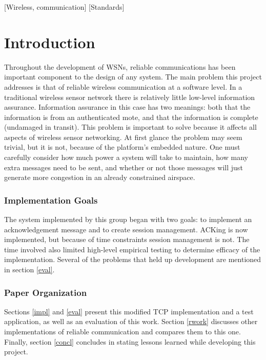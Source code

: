 \documentclass{sig-alternate}
\begin{document}
[Wireless, communication]
[Standards]


\section{Introduction}\label{intro}
Throughout the development of WSNs, reliable communications has been important component to the design of any system. The main problem this project addresses is that of reliable wireless communication at a software level. In a traditional wireless sensor network there is relatively little low-level information assurance. \cite{changsoo:routing} Information assurance in this case has two meanings: both that the information is from an authenticated mote, and that the information is complete (undamaged in transit). This problem is important to solve because it affects all aspects of wireless sensor networking. At first glance the problem may seem trivial, but it is not, because of the platform's embedded nature. One must carefully consider how much power a system will take to maintain, how many extra messages need to be sent, and whether or not those messages will just generate more congestion in an already constrained airspace.

\subsubsection*{Implementation Goals}
The system implemented by this group began with two goals: to implement an acknowledgement message and to create session management. ACKing is now implemented, but because of time constraints session management is not. The time involved also limited high-level empirical testing to determine efficacy of the implementation. Several of the problems that held up development are mentioned in section \ref{eval}.

\subsubsection*{Paper Organization}
Sections \ref{impl} and \ref{eval} present this modified TCP implementation and a test application, as well as an evaluation of this work. Section \ref{rwork} discusses other implementations of reliable communication and compares them to this one. Finally, section \ref{concl} concludes in stating lessons learned while developing this project.
\end{document}
